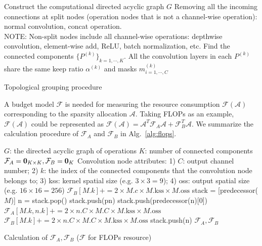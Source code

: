 \documentclass[runningheads]{llncs}
\newcommand{\flops}{\mathcal{F}}
\newcommand{\alphas}{\mathcal{A}}
\begin{document}
  \begin{algorithm}[h]
  \begin{algorithmic}[1]
  \STATE Construct the computational directed acyclic graph $G$
  \STATE Removing all the incoming connections at split nodes (operation nodes that is not a channel-wise operation): normal convolution, concat operation. \\NOTE: Non-split nodes include all channel-wise operations: depthwise convolution, element-wise add, ReLU, batch normalization, etc.
  \STATE Find the connected components $\{P^{(k)}\}_{k=1,\cdots,K}$. All the convolution layers in each $P^{(k)}$ share the same keep ratio $\alpha^{(k)}$ and masks ${m^{(k)}_{i=1,\cdots,C}}$
  \end{algorithmic}
  \caption{Topological grouping procedure}
  \label{alg:grouping}
  \end{algorithm}
  
  
  
  A budget model $\flops$ is needed for measuring the resource consumption $\flops(\alphas)$ corresponding to the sparsity allocation $\alphas$. Taking FLOPs as an example, $\flops(\alphas)$ could be represented as $\flops(\alphas) = \alphas^T \flops_A \alphas + \flops_B^T \alphas$. We summarize the calculation procedure of $\flops_A$ and $\flops_B$ in Alg.~\ref{alg:flops}.
  
  
  \begin{algorithm}[H]
  \begin{algorithmic}[1]
  \STATE $G$: the directed acyclic graph of operations
  \STATE $K$: number of connected components
  \STATE $\flops_A = {\bf 0}_{K \times K}, \flops_B={\bf 0}_{K}$
  \STATE Convolution node attributes: 1) $C$: output channel number; 2) $k$: the index of the connected components that the convolution node belongs to; 3) kss: kernel spatial size (e.g. $3\times 3 = 9$); 4) oss: output spatial size (e.g. $16\times 16=256$)
  \STATE $\flops_B[M.k] += 2 \times M.c \times M.\mbox{kss} \times M.\mbox{oss}$
  \ELSE
      \STATE stack = [predecessor($M$)]
      \STATE n = stack.pop()
      \STATE stack.push(pn)
      \ENDFOR
      \STATE stack.push(predecessor(n)[0])
      \STATE $\flops_A[M.k, n.k] += 2 \times n.C \times M.C \times M.\mbox{kss} \times M.\mbox{oss}$
      \STATE $\flops_B[M.k] += 2 \times n.C \times M.C \times M.\mbox{kss} \times M.\mbox{oss}$
      \ELSE
      \STATE stack.push(n)
      \ENDIF
      \ENDWHILE
  \ENDIF
  \ENDFOR
  \RETURN $\flops_A, \flops_B$
  \end{algorithmic}
  \caption{Calculation of $\flops_A, \flops_B$ ($\flops$ for FLOPs resource)}
  \label{alg:flops}
  \end{algorithm}
  
\end{document}
